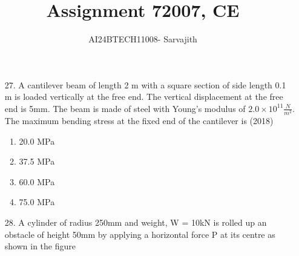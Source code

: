 \documentclass[journal]{IEEEtran}
\begin{document}

\vspace{3cm}


\author{AI24BTECH11008- Sarvajith
}
\title{Assignment 7}
{\let\newpage\relax\maketitle}
\title{2007, CE}
\renewcommand{\thefigure}{\theenumi}
\renewcommand{\thetable}{\theenumi}
\setlength{\intextsep}{10pt} %
\renewcommand{\thetable}{\theenumi}
\begin{enumerate}
    \item[27.] A cantilever beam of length 2 m with a square section of side length 0.1 m is loaded vertically at the free end. The vertical displacement at the free end is 5mm. The beam is made of steel with Young's modulus of $2.0\times 10^{11}\frac{N}{m^2}$. The maximum bending stress at the fixed end of the cantilever is \hfill (2018)
    \begin{enumerate}[label=(\Alph*)]
        \item 20.0 MPa
        \item 37.5 MPa
        \item 60.0 MPa
        \item 75.0 MPa
    \end{enumerate}
    \item[28.] A cylinder of radius 250mm and weight, W = 10kN is rolled up an obstacle of height 50mm by applying a horizontal force P at its centre as shown in the figure
    \begin{figure}[!ht]
        \centering
\end{figure}
\end{enumerate}
\end{document}
